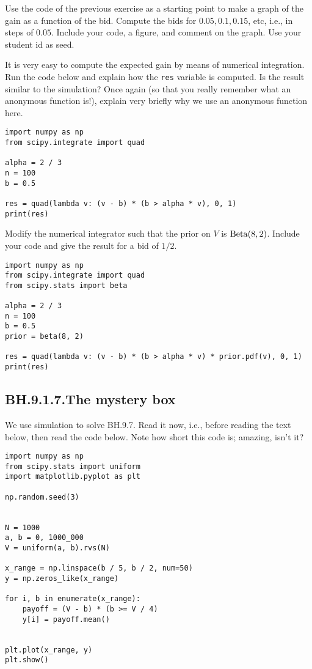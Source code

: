\begin{exercise}
Use the  code of the previous exercise as a starting point to make a graph of the gain as a function of the bid. Compute the bids for $0.05, 0.1, 0.15$, etc, i.e., in steps of $0.05$. Include your code,  a figure, and comment on the graph.  Use your student id as seed.
\end{exercise}


\begin{exercise}
It is very easy to compute the expected gain by means of numerical integration. Run the code below and explain how the \verb|res| variable is computed.  Is the result similar to the simulation? Once again (so that you really remember what an anonymous function is!), explain very briefly why we use an anonymous function here.
\begin{verbatim}
import numpy as np
from scipy.integrate import quad

alpha = 2 / 3
n = 100
b = 0.5

res = quad(lambda v: (v - b) * (b > alpha * v), 0, 1)
print(res)
\end{verbatim}
\end{exercise}

\begin{exercise}
Modify the numerical integrator  such that the prior on $V$ is $\mathrm{Beta}(8, 2)$. Include your code and give the result for a bid of $1/2$.
\begin{solution}
\begin{verbatim}
import numpy as np
from scipy.integrate import quad
from scipy.stats import beta

alpha = 2 / 3
n = 100
b = 0.5
prior = beta(8, 2)

res = quad(lambda v: (v - b) * (b > alpha * v) * prior.pdf(v), 0, 1)
print(res)
\end{verbatim}
\end{solution}
\end{exercise}

\subsection{BH.9.1.7.The mystery box}

We use  simulation to solve  BH.9.7.
Read it now, i.e., before reading the text below, then read the code below.
Note how short  this code is;  amazing, isn't it?



\begin{verbatim}
import numpy as np
from scipy.stats import uniform
import matplotlib.pyplot as plt

np.random.seed(3)


N = 1000
a, b = 0, 1000_000
V = uniform(a, b).rvs(N)

x_range = np.linspace(b / 5, b / 2, num=50)
y = np.zeros_like(x_range)

for i, b in enumerate(x_range):
    payoff = (V - b) * (b >= V / 4)
    y[i] = payoff.mean()


plt.plot(x_range, y)
plt.show()
\end{verbatim}

